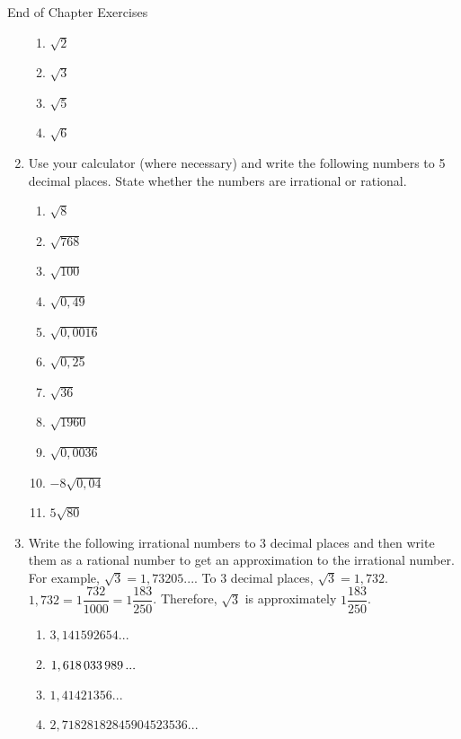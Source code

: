 \begin{eocexercises}{End of Chapter Exercises}
\begin{enumerate}[itemsep=5pt, label=\textbf{\arabic*}. ]
\label{m38349*id325991}\begin{enumerate}[itemsep=5pt, label=\textbf{\alph*}. ] 
            \label{m38349*uid28}\item $\sqrt{2}$\label{m38349*uid29}\item $\sqrt{3}$\label{m38349*uid30}\item $\sqrt{5}$\label{m38349*uid31}\item $\sqrt{6}$\end{enumerate}
        \label{m38349*uid32}\item Use your calculator (where necessary) and write the following numbers to 5 decimal places. State whether the numbers are irrational or rational.
\label{m38349*id326080}\begin{enumerate}[itemsep=5pt, label=\textbf{\alph*}. ] 
            \label{m38349*uid33}\item $\sqrt{8}$\label{m38349*uid34}\item $\sqrt{768}$\label{m38349*uid35}\item $\sqrt{100}$\label{m38349*uid36}\item $\sqrt{0,49}$\label{m38349*uid37}\item $\sqrt{0,0016}$\label{m38349*uid38}\item $\sqrt{0,25}$\label{m38349*uid39}\item $\sqrt{36}$\label{m38349*uid40}\item $\sqrt{1960}$\label{m38349*uid41}\item $\sqrt{0,0036}$\label{m38349*uid42}\item $-8\sqrt{0,04}$\label{m38349*uid43}\item $5\sqrt{80}$\end{enumerate}
        \label{m38349*uid44}\item Write the following irrational numbers to 3 decimal places and then write them as a rational number to get an approximation to the irrational number. For example, $\sqrt{3}=1,73205...$. To 3 decimal places, $\sqrt{3}=1,732$. $1,732=1\dfrac{732}{1000}=1\dfrac{183}{250}$. Therefore, $\sqrt{3}$ is approximately $1\dfrac{183}{250}$.
\label{m38349*id326443}\begin{enumerate}[itemsep=5pt, label=\textbf{\alph*}. ] 
            \label{m38349*uid45}\item $3,141592654...$\label{m38349*uid46}\item $1,618\phantom{\rule{0.166667em}{0ex}}033\phantom{\rule{0.166667em}{0ex}}989\phantom{\rule{0.166667em}{0ex}}...$\label{m38349*uid47}\item $1,41421356...$\label{m38349*uid48}\item $2,71828182845904523536...$\end{enumerate}

\end{enumerate}
\end{eocexercises}
